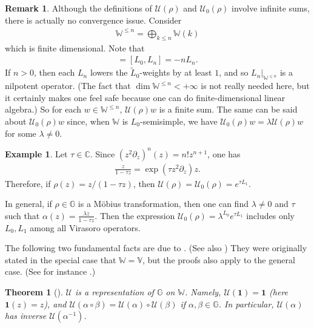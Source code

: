 \documentclass[11pt,b5paper,notitlepage]{article}
\theoremstyle{definition}
\newtheorem{eg}[df]{Example}
\newtheorem{rem}[df]{Remark}
\theoremstyle{plain}
\newtheorem{thm}[df]{Theorem}
\newcommand{\mc}{\mathcal}
\newcommand{\wtd}{\widetilde}
\newcommand{\id}{\mathbf{1}}
\newcommand{\Vbb}{\mathbb V}
\newcommand{\Wbb}{\mathbb W}
\newcommand{\Gbb}{\mathbb G}
\newcommand{\Cbb}{\mathbb C}
\numberwithin{equation}{section}
\begin{document}
\begin{rem}
Although the definitions of $\mc U(\rho)$ and $\mc U_0(\rho)$ involve infinite sums, there is actually no convergence issue. Consider \index{W@$\Wbb^{\leq n}$}
\begin{align*}
\Wbb^{\leq n}=\bigoplus_{k\leq n}\Wbb(k)
\end{align*}
which is finite dimensional. Note that
\begin{align}
[\wtd L_0,L_n]=[L_0,L_n]=-nL_n. \label{eq2}
\end{align}
If $n>0$, then each $L_n$ lowers the $\wtd L_0$-weights by at least $1$, and so $L_n|_{\Wbb^{\leq n}}$ is a nilpotent operator. (The fact that $\dim\Wbb^{\leq n}<+\infty$ is not really needed here, but it certainly makes one feel safe because one can do finite-dimensional linear algebra.) So for each $w\in\Wbb^{\leq n}$, $\mc U(\rho)w$ is a finite sum. The same can be said about $\mc U_0(\rho)w$ since, when $\Wbb$ is $L_0$-semisimple, we have $\mc U_0(\rho)w=\lambda\mc U(\rho)w$ for some $\lambda\neq0$.
\end{rem}



\begin{eg}\label{lb2}
Let $\tau\in\Cbb$. Since $(z^2\partial_z)^n(z)=n!z^{n+1}$, one has
\begin{align*}
\frac{z}{1-\tau z}=\exp(\tau z^2\partial_z)z.
\end{align*}
Therefore, if $\rho(z)=z/(1-\tau z)$, then $\mc U(\rho)=\mc U_0(\rho)=e^{\tau L_1}$. 

In general, if $\rho\in\Gbb$ is a M\"obius transformation, then one can find $\lambda\neq 0$ and $\tau$ such that $\alpha(z)=\frac{\lambda z}{1-\tau z}$. Then the expression $\mc U_0(\rho)=\lambda^{L_0}e^{\tau L_1}$ includes only $L_0, L_1$ among all Virasoro operators.
\end{eg}




The following two fundamental facts are due to \cite{Hua97}. (See also \cite[Chapter 6]{FB04})  They were originally stated in the special case that $\Wbb=\Vbb$, but the proofs also apply to the general case. (See for instance \cite[Sec. 10]{Gui23b}.)


\begin{thm}[{\cite[Sec. 4.2]{Hua97}}]  \label{lb1}
$\mc U$ is a representation of $\Gbb$ on $\Wbb$. Namely, $\mc U(\id)=\id$ (here $\id(z)=z$), and $\mc U(\alpha\circ\beta)=\mc U(\alpha)\circ\mc U(\beta)$ if $\alpha,\beta\in\Gbb$. In particular, $\mc U(\alpha)$ has inverse $\mc U(\alpha^{-1})$.
\end{thm}
\end{document}

